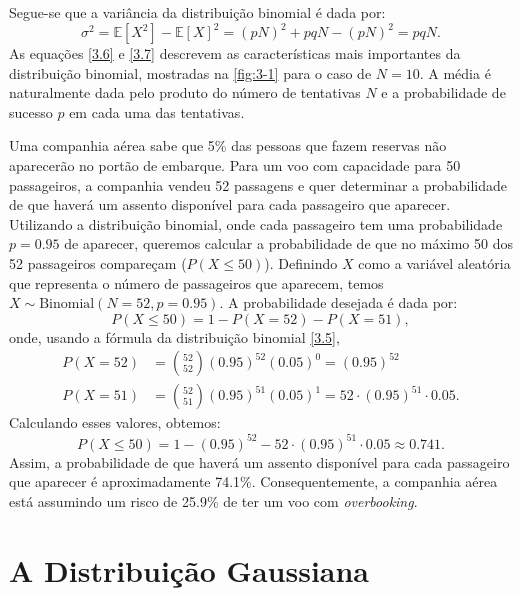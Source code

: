 Segue-se que a variância da distribuição binomial é dada por:
\begin{equation}\label{3.7}
\sigma^2 = \mathbb{E}[X^2] - \mathbb{E}[X]^2 = (pN)^2 + pqN - (pN)^2 = pqN.
\end{equation}
As equações \eqref{3.6} e \eqref{3.7} descrevem as características mais importantes da distribuição binomial, mostradas na \autoref{fig:3-1} para o caso de $N = 10$. A média é naturalmente dada pelo produto do número de tentativas $N$ e a probabilidade de sucesso \(p\) em cada uma das tentativas.

\begin{exemplo}{}{}
Uma companhia aérea sabe que 5\% das pessoas que fazem reservas não aparecerão no portão de embarque. Para um voo com capacidade para 50 passageiros, a companhia vendeu 52 passagens e quer determinar a probabilidade de que haverá um assento disponível para cada passageiro que aparecer. Utilizando a distribuição binomial, onde cada passageiro tem uma probabilidade $p = 0.95$ de aparecer, queremos calcular a probabilidade de que no máximo 50 dos 52 passageiros compareçam ($P(X \leq 50)$). Definindo $X$ como a variável aleatória que representa o número de passageiros que aparecem, temos $X \sim \text{Binomial}(N = 52, p = 0.95)$. A probabilidade desejada é dada por:
\begin{equation*}
P(X \leq 50) = 1 - P(X = 52) - P(X = 51),
\end{equation*}
onde, usando a fórmula da distribuição binomial \eqref{3.5},
\begin{align*}
P(X = 52) &= \binom{52}{52} (0.95)^{52} (0.05)^0 = (0.95)^{52}\\
P(X = 51) &= \binom{52}{51} (0.95)^{51} (0.05)^1 = 52 \cdot (0.95)^{51} \cdot 0.05.
\end{align*}
Calculando esses valores, obtemos:
\begin{equation*}
P(X \leq 50) = 1 - (0.95)^{52} - 52 \cdot (0.95)^{51} \cdot 0.05 \approx 0.741.
\end{equation*}
Assim, a probabilidade de que haverá um assento disponível para cada passageiro que aparecer é aproximadamente 74.1\%. Consequentemente, a companhia aérea está assumindo um risco de 25.9\% de ter um voo com \textit{overbooking}.
\end{exemplo}

\section{A Distribuição Gaussiana}

